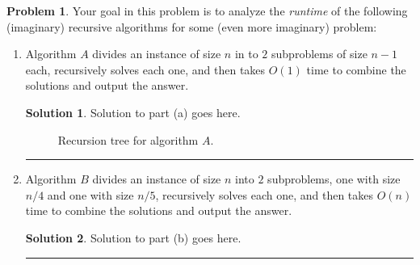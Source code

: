 \documentclass{article}
\theoremstyle{definition}
\newtheorem{problem}{Problem}
\def\fline{\rule{0.75\linewidth}{0.5pt}}
\newcommand{\finishline}{\begin{center}\fline\end{center}}
\newtheorem*{solution*}{Solution}
\newenvironment{solution}{\begin{solution*}}{{\finishline} \end{solution*}}
\begin{document}
		
\begin{problem}
	Your goal in this problem is to analyze the \emph{runtime} of the following (imaginary) recursive algorithms for some (even more imaginary) problem:
	\begin{enumerate}[label=(\Alph*)]
	
		\item Algorithm $A$ divides an instance of size $n$ in to $2$ subproblems of size $n-1$ each, recursively solves each one, and then takes $O(1)$ time to combine the solutions and output the answer. 	
		
		    \begin{solution}
	Solution to part (a) goes here. %
	

		\begin{figure}[h!]
			\centering
		\caption{Recursion tree for algorithm $A$.} 
		\end{figure}
		
\end{solution}

		\item Algorithm $B$ divides an instance of size $n$ into $2$ subproblems, one with size $n/4$ and one with size $n/5$, recursively solves each one, and then takes $O(n)$ time 
		to combine the solutions and output the answer. 
		
		    \begin{solution}
	Solution to part (b) goes here. %
	

\end{solution}
\end{enumerate}
\end{problem}
\end{document}

